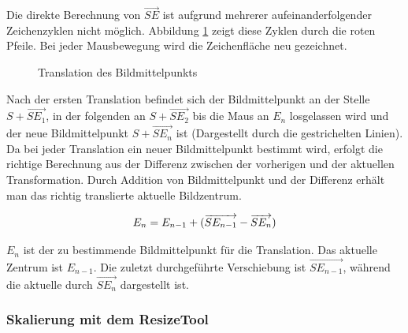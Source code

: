 Die direkte Berechnung von $\overrightarrow{SE}$ ist aufgrund mehrerer aufeinanderfolgender Zeichenzyklen nicht möglich. Abbildung \ref{movetool} zeigt diese Zyklen durch die roten Pfeile. Bei jeder Mausbewegung wird die Zeichenfläche neu gezeichnet. 

\begin{figure}[htbp]
  \vspace{0.5cm}
  \centering
   \caption{Translation des Bildmittelpunkts}
  \label{movetool}
  \vspace{0.5cm}
\end{figure}

Nach der ersten Translation befindet sich der Bildmittelpunkt an der Stelle $S + \overrightarrow{SE_1}$, in der folgenden an $S + \overrightarrow{SE_2}$ bis die Maus an $E_n$ losgelassen wird und der neue Bildmittelpunkt $S + \overrightarrow{SE_n}$ ist (Dargestellt durch die gestrichelten Linien). Da bei jeder Translation ein neuer Bildmittelpunkt bestimmt wird, erfolgt die richtige Berechnung aus der Differenz zwischen der vorherigen und der aktuellen Transformation. Durch Addition von Bildmittelpunkt und der Differenz erhält man das richtig translierte aktuelle Bildzentrum.

\begin{equation}
E_n= E_{n-1} + (\overrightarrow{SE_{n-1}}-\overrightarrow{SE_n})
\vspace{0.5cm}
\end{equation}

$E_n$ ist der zu bestimmende Bildmittelpunkt für die Translation. Das aktuelle Zentrum ist $E_{n-1}$. Die zuletzt durchgeführte Verschiebung ist $\overrightarrow{SE_{n-1}}$, während die aktuelle durch $\overrightarrow{SE_n}$ dargestellt ist.

\subsubsection{Skalierung mit dem ResizeTool}

